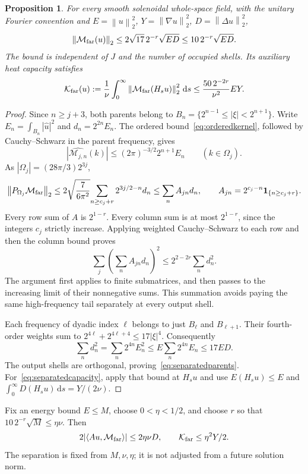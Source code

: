 \documentclass[11pt]{article}
\newtheorem{proposition}{Proposition}
\newcommand{\dd}{\,\mathrm d}
\newcommand{\norm}[1]{\left\lVert#1\right\rVert}
\begin{document}
\begin{proposition}\label{prop:separatedparents}
For every smooth solenoidal whole-space field, with the unitary Fourier
convention and $E=\norm u_2^2$, $Y=\norm{\nabla u}_2^2$,
$D=\norm{\Delta u}_2^2$,
\begin{equation}\label{eq:separatedparents}
 \norm{\mathcal M_{\rm far}(u)}_2
 \leq 2\sqrt{17}\,2^{-r}\sqrt{ED}
 \leq 10\,2^{-r}\sqrt{ED}.
\end{equation}
The bound is independent of $J$ and the number of occupied shells.
Its auxiliary heat capacity satisfies
\begin{equation}\label{eq:separatedcapacity}
 \mathcal K_{\rm far}(u):=\frac1\nu\int_0^\infty
             \norm{\mathcal M_{\rm far}(H_su)}_2^2\dd s
 \leq \frac{50\,2^{-2r}}{\nu^2}EY.
\end{equation}
\end{proposition}
\begin{proof}
Since $n\geq j+3$, both parents belong to
$B_n=\{2^{n-1}\leq|\xi|<2^{n+1}\}$. Write
$E_n=\int_{B_n}|\widehat u|^2$ and $d_n=2^{2n}E_n$.
The ordered bound~\eqref{eq:orderedkernel}, followed by
Cauchy--Schwarz in the parent frequency, gives
\[
 |\widehat{\mathcal M_{j,n}}(k)|
 \leq(2\pi)^{-3/2}2^{n+1}E_n\qquad(k\in\Omega_j).
\]
As $|\Omega_j|=(28\pi/3)2^{3j}$,
\[
 \norm{P_{\Omega_j}\mathcal M_{\rm far}}_2
 \leq 2\sqrt{\frac7{6\pi^2}}\!
       \sum_{n\geq c_j+r}2^{3j/2-n}d_n
 \leq\sum_n A_{jn}d_n,\qquad
 A_{jn}=2^{c_j-n}\mathbf1_{\{n\geq c_j+r\}}.
\]
Every row sum of $A$ is $2^{1-r}$. Every column sum is at most
$2^{1-r}$, since the integers $c_j$ strictly increase. Applying weighted
Cauchy--Schwarz to each row and then the column bound proves
\[
 \sum_j\left(\sum_n A_{jn}d_n\right)^2
 \leq 2^{2-2r}\sum_n d_n^2.
\]
The argument first applies to finite submatrices, and then passes to
the increasing limit of their nonnegative sums. This summation avoids
paying the same high-frequency tail separately at every output shell.

Each frequency of dyadic index $\ell$ belongs to just $B_\ell$ and
$B_{\ell+1}$. Their fourth-order weights sum to
$2^{4\ell}+2^{4\ell+4}\leq17|\xi|^4$. Consequently
\[
 \sum_n d_n^2=\sum_n2^{4n}E_n^2
 \leq E\sum_n2^{4n}E_n\leq17ED.
\]
The output shells are orthogonal, proving~\eqref{eq:separatedparents}.
For~\eqref{eq:separatedcapacity}, apply that bound at $H_su$ and use
$E(H_su)\leq E$ and $\int_0^\infty D(H_su)\dd s=Y/(2\nu)$.
\end{proof}

Fix an energy bound $E\leq M$, choose $0<\eta<1/2$, and choose $r$
so that $10\,2^{-r}\sqrt M\leq\eta\nu$. Then
\begin{equation}\label{eq:separatedpayment}
 2|\langle Au,\mathcal M_{\rm far}\rangle|\leq2\eta\nu D,
 \qquad \mathcal K_{\rm far}\leq\eta^2Y/2.
\end{equation}
The separation is fixed from $M,\nu,\eta$; it is not adjusted from a
future solution norm.
\end{document}
